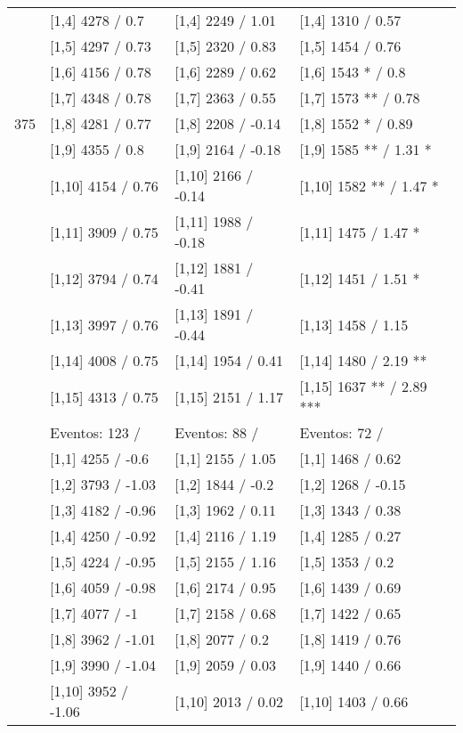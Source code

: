 \begin{table}
\begin{tabular}[t]{llll}
\addlinespace
 & {}[1,4] 4278  / 0.7 & {}[1,4] 2249  / 1.01 & {}[1,4] 1310  / 0.57\\
 & {}[1,5] 4297  / 0.73 & {}[1,5] 2320  / 0.83 & {}[1,5] 1454  / 0.76\\
 & {}[1,6] 4156  / 0.78 & {}[1,6] 2289  / 0.62 & {}[1,6] 1543 * / 0.8\\
 & {}[1,7] 4348  / 0.78 & {}[1,7] 2363  / 0.55 & {}[1,7] 1573 ** / 0.78\\
375 & {}[1,8] 4281  / 0.77 & {}[1,8] 2208  / -0.14 & {}[1,8] 1552 * / 0.89\\
\addlinespace
 & {}[1,9] 4355  / 0.8 & {}[1,9] 2164  / -0.18 & {}[1,9] 1585 ** / 1.31 *\\
 & {}[1,10] 4154  / 0.76 & {}[1,10] 2166  / -0.14 & {}[1,10] 1582 ** / 1.47 *\\
 & {}[1,11] 3909  / 0.75 & {}[1,11] 1988  / -0.18 & {}[1,11] 1475  / 1.47 *\\
 & {}[1,12] 3794  / 0.74 & {}[1,12] 1881  / -0.41 & {}[1,12] 1451  / 1.51 *\\
 & {}[1,13] 3997  / 0.76 & {}[1,13] 1891  / -0.44 & {}[1,13] 1458  / 1.15\\
\addlinespace
 & {}[1,14] 4008  / 0.75 & {}[1,14] 1954  / 0.41 & {}[1,14] 1480  / 2.19 **\\
 & {}[1,15] 4313  / 0.75 & {}[1,15] 2151  / 1.17 & {}[1,15] 1637 ** / 2.89 ***\\
 & Eventos:  123 / & Eventos:  88 / & Eventos:  72 /\\
 & {}[1,1] 4255  / -0.6 & {}[1,1] 2155  / 1.05 & {}[1,1] 1468  / 0.62\\
 & {}[1,2] 3793  / -1.03 & {}[1,2] 1844  / -0.2 & {}[1,2] 1268  / -0.15\\
\addlinespace
 & {}[1,3] 4182  / -0.96 & {}[1,3] 1962  / 0.11 & {}[1,3] 1343  / 0.38\\
 & {}[1,4] 4250  / -0.92 & {}[1,4] 2116  / 1.19 & {}[1,4] 1285  / 0.27\\
 & {}[1,5] 4224  / -0.95 & {}[1,5] 2155  / 1.16 & {}[1,5] 1353  / 0.2\\
 & {}[1,6] 4059  / -0.98 & {}[1,6] 2174  / 0.95 & {}[1,6] 1439  / 0.69\\
 & {}[1,7] 4077  / -1 & {}[1,7] 2158  / 0.68 & {}[1,7] 1422  / 0.65\\
\addlinespace
500 & {}[1,8] 3962  / -1.01 & {}[1,8] 2077  / 0.2 & {}[1,8] 1419  / 0.76\\
 & {}[1,9] 3990  / -1.04 & {}[1,9] 2059  / 0.03 & {}[1,9] 1440  / 0.66\\
 & {}[1,10] 3952  / -1.06 & {}[1,10] 2013  / 0.02 & {}[1,10] 1403  / 0.66\\

\end{tabular}
\end{table}
